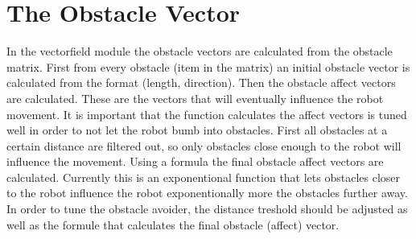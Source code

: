 \documentclass[a4paper, 12pt, oneside]{report}
\begin{document}
\section{The Obstacle Vector}
In the vectorfield module the obstacle vectors are calculated from the obstacle matrix. 
First from every obstacle (item in the matrix) an initial obstacle vector is calculated from the format (length, direction). 
Then the obstacle affect vectors are calculated. 
These are the vectors that will eventually influence the robot movement. 
It is important that the function calculates the affect vectors is tuned well in order to not let the robot bumb into obstacles. 
First all obstacles at a certain distance are filtered out, so only obstacles close enough to the robot will influence the movement. 
Using a formula the final obstacle affect vectors are calculated. 
Currently this is an exponentional function that lets obstacles closer to the robot influence the robot exponentionally more the obstacles further away. 
In order to tune the obstacle avoider, the distance treshold should be adjusted as well as the formule that calculates the final obstacle (affect) vector.
\end{document}
